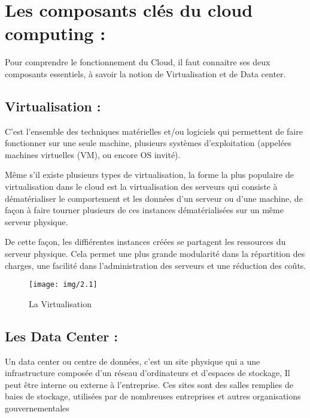 \section{Les composants clés du cloud computing :}
Pour comprendre le fonctionnement du Cloud, il faut connaitre ses deux composants essentiels, à savoir la notion de Virtualisation et de Data center.

\subsection{Virtualisation :}
C'est l'ensemble des techniques matérielles et/ou logiciels qui permettent de faire fonctionner sur une seule machine, plusieurs systèmes d'exploitation (appelées machines virtuelles (VM), ou encore OS invité).

Même s'il existe plusieurs types de virtualisation, la forme la plus populaire de virtualisation dans le cloud est la virtualisation des serveurs qui consiste à dématérialiser le comportement et les données d'un serveur ou d'une machine, de façon à faire tourner plusieurs de ces instances dématérialisées sur un même serveur physique.

De cette façon, les diffiérentes instances créées se partagent les ressources du serveur physique. Cela permet une plus grande modularité dans la répartition des charges, une facilité dans l'administration des serveurs et une réduction des coûts.

\begin{figure}[h]
	\centering
	\texttt{[image: img/2.1]}
	\caption{La Virtualisation}
\end{figure}

\subsection{Les Data Center :}
Un data center ou centre de données, c'est un site physique qui a une infrastructure composée d'un réseau d'ordinateurs et d'espaces de stockage, Il peut être interne ou externe à l'entreprise. Ces sites sont des salles remplies de baies de stockage, utilisées par de nombreuses entreprises et autres organisations gouvernementales

